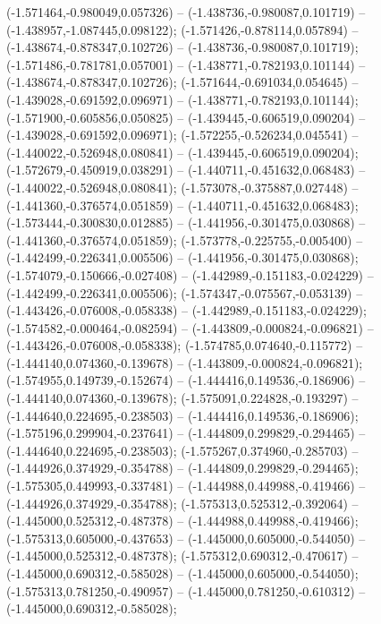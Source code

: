  (-1.571464,-0.980049,0.057326) -- (-1.438736,-0.980087,0.101719) -- (-1.438957,-1.087445,0.098122);
 (-1.571426,-0.878114,0.057894) -- (-1.438674,-0.878347,0.102726) -- (-1.438736,-0.980087,0.101719);
 (-1.571486,-0.781781,0.057001) -- (-1.438771,-0.782193,0.101144) -- (-1.438674,-0.878347,0.102726);
 (-1.571644,-0.691034,0.054645) -- (-1.439028,-0.691592,0.096971) -- (-1.438771,-0.782193,0.101144);
 (-1.571900,-0.605856,0.050825) -- (-1.439445,-0.606519,0.090204) -- (-1.439028,-0.691592,0.096971);
 (-1.572255,-0.526234,0.045541) -- (-1.440022,-0.526948,0.080841) -- (-1.439445,-0.606519,0.090204);
 (-1.572679,-0.450919,0.038291) -- (-1.440711,-0.451632,0.068483) -- (-1.440022,-0.526948,0.080841);
 (-1.573078,-0.375887,0.027448) -- (-1.441360,-0.376574,0.051859) -- (-1.440711,-0.451632,0.068483);
 (-1.573444,-0.300830,0.012885) -- (-1.441956,-0.301475,0.030868) -- (-1.441360,-0.376574,0.051859);
 (-1.573778,-0.225755,-0.005400) -- (-1.442499,-0.226341,0.005506) -- (-1.441956,-0.301475,0.030868);
 (-1.574079,-0.150666,-0.027408) -- (-1.442989,-0.151183,-0.024229) -- (-1.442499,-0.226341,0.005506);
 (-1.574347,-0.075567,-0.053139) -- (-1.443426,-0.076008,-0.058338) -- (-1.442989,-0.151183,-0.024229);
 (-1.574582,-0.000464,-0.082594) -- (-1.443809,-0.000824,-0.096821) -- (-1.443426,-0.076008,-0.058338);
 (-1.574785,0.074640,-0.115772) -- (-1.444140,0.074360,-0.139678) -- (-1.443809,-0.000824,-0.096821);
 (-1.574955,0.149739,-0.152674) -- (-1.444416,0.149536,-0.186906) -- (-1.444140,0.074360,-0.139678);
 (-1.575091,0.224828,-0.193297) -- (-1.444640,0.224695,-0.238503) -- (-1.444416,0.149536,-0.186906);
 (-1.575196,0.299904,-0.237641) -- (-1.444809,0.299829,-0.294465) -- (-1.444640,0.224695,-0.238503);
 (-1.575267,0.374960,-0.285703) -- (-1.444926,0.374929,-0.354788) -- (-1.444809,0.299829,-0.294465);
 (-1.575305,0.449993,-0.337481) -- (-1.444988,0.449988,-0.419466) -- (-1.444926,0.374929,-0.354788);
 (-1.575313,0.525312,-0.392064) -- (-1.445000,0.525312,-0.487378) -- (-1.444988,0.449988,-0.419466);
 (-1.575313,0.605000,-0.437653) -- (-1.445000,0.605000,-0.544050) -- (-1.445000,0.525312,-0.487378);
 (-1.575312,0.690312,-0.470617) -- (-1.445000,0.690312,-0.585028) -- (-1.445000,0.605000,-0.544050);
 (-1.575313,0.781250,-0.490957) -- (-1.445000,0.781250,-0.610312) -- (-1.445000,0.690312,-0.585028);
